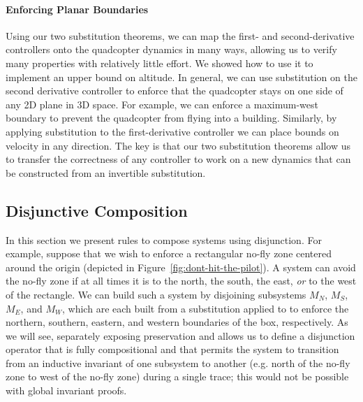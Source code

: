 \paragraph*{Enforcing Planar Boundaries}
Using our two substitution theorems, we can map the first- and
second-derivative controllers onto the quadcopter dynamics in many ways,
allowing us to verify many properties with relatively little effort.  We
showed how to use it to implement an upper bound on altitude.  In general,
we can use substitution on the second derivative controller to enforce that
the quadcopter stays on one side of any 2D plane in 3D space.  For example,
we can enforce a maximum-west boundary to prevent the quadcopter from
flying into a building.  Similarly, by applying substitution to the
first-derivative controller we can place bounds on velocity in any
direction.  The key is that our two substitution theorems allow us to
transfer the correctness of any controller to work on a new dynamics that
can be constructed from an invertible substitution.

\subsection{Disjunctive Composition}
\label{sec:disjunctive-composition}

In this section we present rules to compose systems using disjunction.  For
example, suppose that we wish to enforce a rectangular no-fly zone centered
around the origin (depicted in Figure~\ref{fig:dont-hit-the-pilot}).  A
system can avoid the no-fly zone if at all times it is to the north, the
south, the east, \emph{or} to the west of the rectangle.  We can build such
a system by disjoining subsystems $M_N$, $M_S$, $M_E$, and $M_W$, which are
each built from a substitution applied to \derivShimx{} to enforce the
northern, southern, eastern, and western boundaries of the box,
respectively.  As we will see, separately exposing preservation
and \progress{} allows us to define a disjunction operator that is fully
compositional and that permits the system to transition from an inductive
invariant of one subsystem to another (e.g. north of the no-fly zone to
west of the no-fly zone) during a single trace; this would not be possible
with global invariant proofs.

